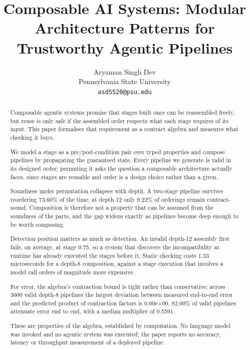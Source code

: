\documentclass[10pt,journal,compsoc,twocolumn]{IEEEtran}
\begin{document}
\title{Composable AI Systems: Modular Architecture Patterns for Trustworthy Agentic Pipelines}

\author{
Aryaman Singh Dev\\
Pennsylvania State University \\
\texttt{asd5520@psu.edu}
}

\maketitle

\begin{abstract}
Composable agentic systems promise that stages built once can be reassembled freely, but reuse is only safe if the assembled order respects what each stage requires of its input. This paper formalises that requirement as a contract algebra and measures what checking it buys.

We model a stage as a pre/post-condition pair over typed properties and compose pipelines by propagating the guaranteed state. Every pipeline we generate is valid in its designed order; permuting it asks the question a composable architecture actually faces, since stages are reusable and order is a design choice rather than a given.

Soundness under permutation collapses with depth. A two-stage pipeline survives reordering 73.60\% of the time; at depth 12 only 9.22\% of orderings remain contract-sound. Composition is therefore not a property that can be assumed from the soundness of the parts, and the gap widens exactly as pipelines become deep enough to be worth composing.

Detection position matters as much as detection. An invalid depth-12 assembly first fails, on average, at stage 0.75, so a system that discovers the incompatibility at runtime has already executed the stages before it. Static checking costs 1.33 microseconds for a depth-8 composition, against a stage execution that involves a model call orders of magnitude more expensive.

For error, the algebra's contraction bound is tight rather than conservative: across 3000 valid depth-8 pipelines the largest deviation between measured end-to-end error and the predicted product of contraction factors is 0.00e+00. 82.00\% of valid pipelines attenuate error end to end, with a median multiplier of 0.5591.

These are properties of the algebra, established by computation. No language model was invoked and no agentic system was executed; the paper reports no accuracy, latency or throughput measurement of a deployed pipeline.
\end{abstract}
\end{document}
